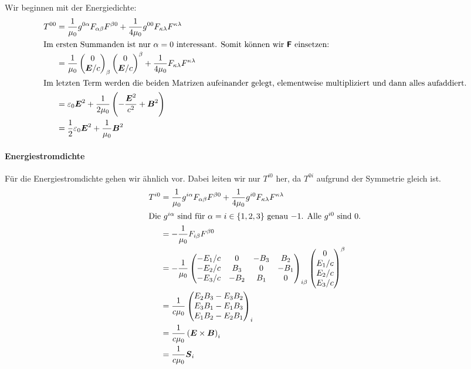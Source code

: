Wir beginnen mit der Energiedichte:
\begin{align*}
	T^{00}
	&= \frac1{\mu_0} g^{0\alpha} F_{\alpha\beta} F^{\beta0} + \frac1{4\mu_0} g^{00} F_{\kappa\lambda} F^{\kappa\lambda} \\
	\intertext{%
		Im ersten Summanden ist nur $\alpha = 0$ interessant. Somit können wir
		$\tens F$ einsetzen:
	}
	&= \frac1{\mu_0}
	\begin{pmatrix}
		0 \\ \vec E / c
	\end{pmatrix}
	_\beta
	\begin{pmatrix}
		0 \\ \vec E / c
	\end{pmatrix}
	^\beta
	+ \frac1{4\mu_0} F_{\kappa\lambda} F^{\kappa\lambda} \\
	\intertext{%
		Im letzten Term werden die beiden Matrizen aufeinander gelegt,
		elementweise multipliziert und dann alles aufaddiert.
	}
	&= \varepsilon_0 \vec E^2 + \frac1{2\mu_0} \del{- \frac{\vec E^2}{c^2} + \vec B^2} \\
	&= \half \varepsilon_0 \vec E^2 + \frac1{\mu_0} \vec B^2
\end{align*}

\paragraph{Energiestromdichte}

Für die Energiestromdichte gehen wir ähnlich vor. Dabei leiten wir nur $T^{i0}$
her, da $T^{0i}$ aufgrund der Symmetrie gleich ist.
\begin{align*}
	T^{i0}
	&= \frac1{\mu_0} g^{i\alpha} F_{\alpha\beta} F^{\beta0} + \frac1{4\mu_0} g^{i0} F_{\kappa\lambda} F^{\kappa\lambda} \\
	\intertext{%
		Die $g^{i\alpha}$ sind für $\alpha = i \in \set{1, 2, 3}$ genau $-1$. Alle
		$g^{i0}$ sind 0.
	}
	&= - \frac1{\mu_0} F_{i\beta} F^{\beta0} \\
	&= - \frac1{\mu_0}
	\begin{pmatrix}
		- E_1/c & 0 & -B_3 & B_2 \\
		- E_2/c & B_3 & 0 & -B_1 \\
		- E_3/c & -B_2 & B_1 & 0 \\
	\end{pmatrix}_{i\beta}
	\begin{pmatrix}
		0 \\ E_1/c \\ E_2/c \\ E_3/c
	\end{pmatrix}^{\beta}
	\\
	&= \frac1{c\mu_0}
	\begin{pmatrix}
		E_2B_3 - E_3B_2 \\
		E_3B_1 - E_1B_3 \\
		E_1B_2 - E_2B_1
	\end{pmatrix}_i \\
	&= \frac1{c\mu_0} \del{\vec E \times \vec B}_i \\
	&= \frac1{c\mu_0} \vec S_i \\
\end{align*}

